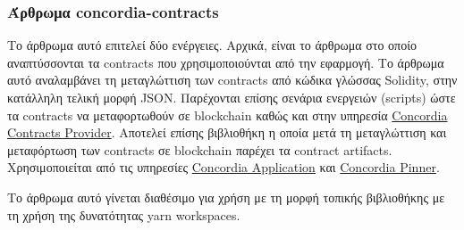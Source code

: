 \subsubsection{Άρθρωμα concordia-contracts} \label{subsubsection:4-3-1-concordia-contracts-unit}

Το άρθρωμα αυτό επιτελεί δύο ενέργειες. Αρχικά, είναι το άρθρωμα στο οποίο αναπτύσσονται τα contracts που χρησιμοποιούνται από την εφαρμογή. Το άρθρωμα αυτό αναλαμβάνει τη μεταγλώττιση των contracts από κώδικα γλώσσας Solidity, στην κατάλληλη τελική μορφή JSON. Παρέχονται επίσης σενάρια ενεργειών (scripts) ώστε τα contracts να μεταφορτωθούν σε blockchain καθώς και στην υπηρεσία \hyperref[subsection:4-3-5-concordia-contracts-provider-service]{Concordia Contracts Provider}. Αποτελεί επίσης βιβλιοθήκη η οποία μετά τη μεταγλώττιση και μεταφόρτωση των contracts σε blockchain παρέχει τα contract artifacts. Χρησιμοποιείται από τις υπηρεσίες \hyperref[subsection:4-3-2-concordia-application-service]{Concordia Application} και \hyperref[subsection:4-3-4-concordia-pinner-service]{Concordia Pinner}.

Το άρθρωμα αυτό γίνεται διαθέσιμο για χρήση με τη μορφή τοπικής βιβλιοθήκης με τη χρήση της δυνατότητας yarn workspaces.